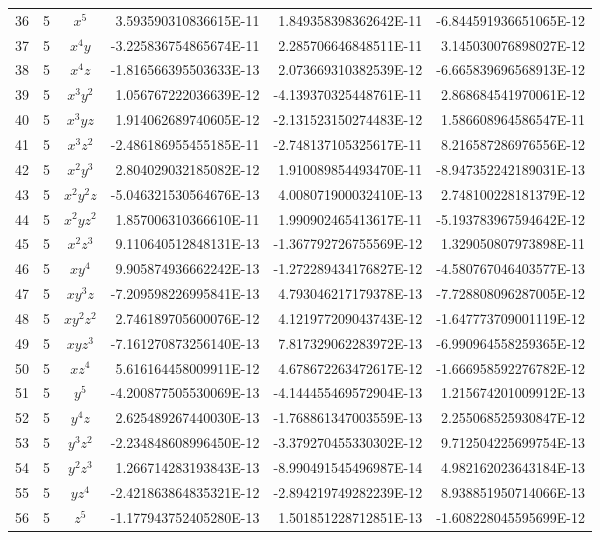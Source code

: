 \documentclass{article}
\begin{document}
\begin{table}[ht!]
\begin{center}
\begin{tabular}{rrcrrr}
36 & 5 & $x^{5}$ & 3.593590310836615E-11 & 1.849358398362642E-11 & -6.844591936651065E-12 \\ 
37 & 5 & $x^{4}y$ & -3.225836754865674E-11 & 2.285706646848511E-11 & 3.145030076898027E-12 \\ 
38 & 5 & $x^{4}z$ & -1.816566395503633E-13 & 2.073669310382539E-12 & -6.665839696568913E-12 \\ 
39 & 5 & $x^{3}y^{2}$ & 1.056767222036639E-12 & -4.139370325448761E-11 & 2.868684541970061E-12 \\ 
40 & 5 & $x^{3}yz$ & 1.914062689740605E-12 & -2.131523150274483E-12 & 1.586608964586547E-11 \\ 
41 & 5 & $x^{3}z^{2}$ & -2.486186955455185E-11 & -2.748137105325617E-11 & 8.216587286976556E-12 \\ 
42 & 5 & $x^{2}y^{3}$ & 2.804029032185082E-12 & 1.910089854493470E-11 & -8.947352242189031E-13 \\ 
43 & 5 & $x^{2}y^{2}z$ & -5.046321530564676E-13 & 4.008071900032410E-13 & 2.748100228181379E-12 \\ 
44 & 5 & $x^{2}yz^{2}$ & 1.857006310366610E-11 & 1.990902465413617E-11 & -5.193783967594642E-12 \\ 
45 & 5 & $x^{2}z^{3}$ & 9.110640512848131E-13 & -1.367792726755569E-12 & 1.329050807973898E-11 \\ 
46 & 5 & $xy^{4}$ & 9.905874936662242E-13 & -1.272289434176827E-12 & -4.580767046403577E-13 \\ 
47 & 5 & $xy^{3}z$ & -7.209598226995841E-13 & 4.793046217179378E-13 & -7.728808096287005E-12 \\ 
48 & 5 & $xy^{2}z^{2}$ & 2.746189705600076E-12 & 4.121977209043743E-12 & -1.647773709001119E-12 \\ 
49 & 5 & $xyz^{3}$ & -7.161270873256140E-13 & 7.817329062283972E-13 & -6.990964558259365E-12 \\ 
50 & 5 & $xz^{4}$ & 5.616164458009911E-12 & 4.678672263472617E-12 & -1.666958592276782E-12 \\ 
51 & 5 & $y^{5}$ & -4.200877505530069E-13 & -4.144455469572904E-13 & 1.215674201009912E-13 \\ 
52 & 5 & $y^{4}z$ & 2.625489267440030E-13 & -1.768861347003559E-13 & 2.255068525930847E-12 \\ 
53 & 5 & $y^{3}z^{2}$ & -2.234848608996450E-12 & -3.379270455330302E-12 & 9.712504225699754E-13 \\ 
54 & 5 & $y^{2}z^{3}$ & 1.266714283193843E-13 & -8.990491545496987E-14 & 4.982162023643184E-13 \\ 
55 & 5 & $yz^{4}$ & -2.421863864835321E-12 & -2.894219749282239E-12 & 8.938851950714066E-13 \\ 
56 & 5 & $z^{5}$ & -1.177943752405280E-13 & 1.501851228712851E-13 & -1.608228045595699E-12 \\ 
\bottomrule
\end{tabular}
\end{center}



\end{table}
\end{document}

